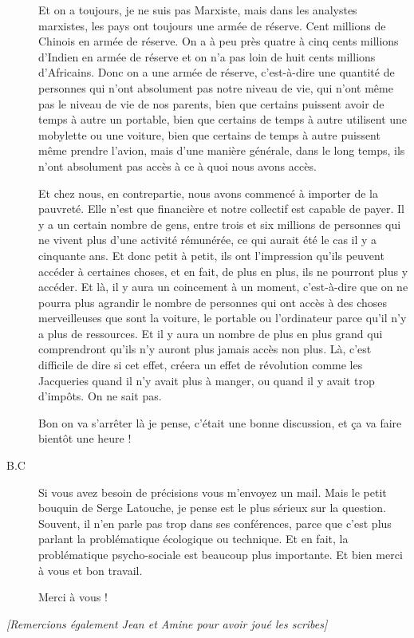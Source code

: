 \begin{description}
Et on a toujours, je ne suis pas Marxiste, mais dans les analystes marxistes, les pays ont toujours une armée de réserve. Cent millions de Chinois en armée de réserve. On a à peu près quatre à cinq cents millions d'Indien en armée de réserve et on n’a pas loin de huit cents millions d'Africains. Donc on a une armée de réserve, c'est-à-dire une quantité de personnes qui n'ont absolument pas notre niveau de vie, qui n'ont même pas le niveau de vie de nos parents, bien que certains puissent avoir de temps à autre un portable, bien que certains de temps à autre utilisent une mobylette ou une voiture, bien que certains de temps à autre puissent même prendre l'avion, mais d'une manière générale, dans le long temps, ils n'ont absolument pas accès à ce à quoi nous avons accès. 

Et chez nous, en contrepartie, nous avons commencé à importer de la pauvreté. Elle n'est que financière et notre collectif est capable de payer. Il y a un certain nombre de gens, entre trois et six millions de personnes qui ne vivent plus d'une activité rémunérée, ce qui aurait été le cas il y a cinquante ans. Et donc petit à petit, ils ont l'impression qu'ils peuvent accéder à certaines choses, et en fait, de plus en plus, ils ne pourront plus y accéder. Et là, il y aura un coincement à un moment, c'est-à-dire que on ne pourra plus agrandir le nombre de personnes qui ont accès à des choses merveilleuses que sont la voiture, le portable ou l'ordinateur parce qu’il n'y a plus de ressources. Et il y aura un nombre de plus en plus grand qui comprendront qu'ils n'y auront plus jamais accès non plus. Là, c'est difficile de dire si cet effet, créera un effet de révolution comme les Jacqueries quand il n'y avait plus à manger, ou quand il y avait trop d'impôts. On ne sait pas.

\vspace{1\baselineskip}

Bon on va s’arrêter là je pense, c'était une bonne discussion, et ça va faire bientôt une heure !

\vspace{1\baselineskip}

\item[B.C]Si vous avez besoin de précisions vous m'envoyez un mail. Mais le petit bouquin de Serge Latouche, je pense est le plus sérieux sur la question. Souvent, il n'en parle pas trop dans ses conférences, parce que c'est plus parlant la problématique écologique ou technique. Et en fait, la problématique psycho-sociale est beaucoup plus importante. 
Et bien merci à vous et bon travail.

\vspace{1\baselineskip}

Merci à vous !


\end{description}

\textit{[Remercions également Jean et Amine pour avoir joué les scribes]}